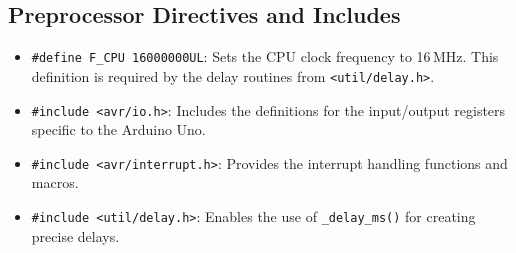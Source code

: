 \documentclass{article}
\theoremstyle{remark}
\begin{document}
\subsection{Preprocessor Directives and Includes}
\begin{itemize}[noitemsep]
    \item \texttt{\#define F\_CPU 16000000UL}: Sets the CPU clock frequency to 16\,MHz. This definition is required by the delay routines from \texttt{<util/delay.h>}.
    \item \texttt{\#include <avr/io.h>}: Includes the definitions for the input/output registers specific to the Arduino Uno.
    \item \texttt{\#include <avr/interrupt.h>}: Provides the interrupt handling functions and macros.
    \item \texttt{\#include <util/delay.h>}: Enables the use of \texttt{\_delay\_ms()} for creating precise delays.
\end{itemize}
\end{document}
